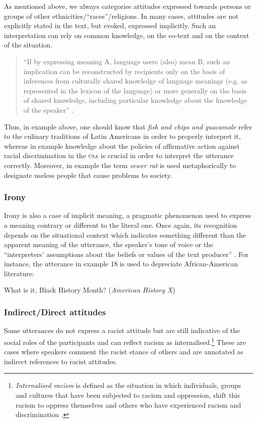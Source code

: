 \documentclass[output=paper]{LSP/langsci}
\begin{document}
As mentioned above, we always categorise attitudes expressed towards persons or groups of other ethnicities/“races”/religions. In many cases, attitudes are not explicitly stated in the text, but evoked, expressed implicitly. Such an interpretation can rely on common knowledge, on the co-text and on the context of the situation.

\begin{quote}
“If by expressing meaning A, language users (also) mean B, such an implication can be reconstructed by recipients only on the basis of inferences from culturally shared knowledge of language meanings (e.g. as represented in the lexicon of the language) or more generally on the basis of shared knowledge, including particular knowledge about the knowledge of the speaker” \citep[168]{Dijk1995}.
\end{quote}

Thus, in example  above, one should know that \textit{fish and chips and guacamole} refer to the culinary traditions of Latin Americans in order to properly interpret it, whereas in example  knowledge about the policies of affirmative action against racial discrimination in the \textsc{usa} is crucial in order to interpret the utterance correctly. Moreover, in example  the term \textit{sewer rat} is used metaphorically to designate useless people that cause problems to society.

\subsubsection{Irony}

Irony is also a case of implicit meaning, a pragmatic phenomenon used to express a meaning contrary or different to the literal one. Once again, its recognition depends on the situational context which indicates something different than the apparent meaning of the utterance, the speaker's tone of voice or the “interpreters' assumptions about the beliefs or values of the text producer”  \citep[123]{Fairclough1992}. For instance, the utterance in example 18 is used to depreciate African-American literature:

\ea \label{ex:2:18} What is it, Black History Month? (\textit{American History X})
\z

\subsubsection{Indirect/Direct attitudes}
Some utterances do not express a racist attitude but are still indicative of the social roles of the participants and can reflect racism as internalised.\footnote{\textit{Internalised racism} is defined as the situation in which individuals, groups and cultures that have been subjected to racism and oppression, shift this racism to oppress themselves and others who have experienced racism and discrimination \citep[92]{Lawrence2002}.} These are cases where speakers comment the racist stance of others and are annotated as indirect references to racist attitudes.\newline
\end{document}
